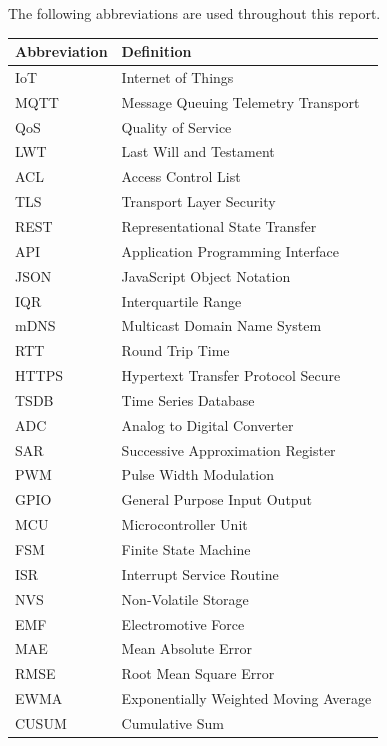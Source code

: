\documentclass[a4paper, oneside, 13.5pt, top=2.5cm, bottom=2.5cm, left=3cm, right=2.5cm]{book}
\begin{document}
\tableofcontents
\newpage
\listoftables
\listoffigures
\newpage
\pagestyle{fancy}

\begin{abbreviation}
The following abbreviations are used throughout this report.
\begin{table}[!h]
\renewcommand{\arraystretch}{1.3}
\begin{tabular}{p{3cm} p{11cm}}
\textbf{Abbreviation} &  \textbf{Definition} \\
\hline
IoT   & Internet of Things \\
MQTT  & Message Queuing Telemetry Transport \\
QoS   & Quality of Service \\
LWT   & Last Will and Testament \\
ACL   & Access Control List \\
TLS   & Transport Layer Security \\
REST  & Representational State Transfer \\
API   & Application Programming Interface \\
JSON  & JavaScript Object Notation \\
IQR   & Interquartile Range \\
mDNS  & Multicast Domain Name System \\
RTT   & Round Trip Time \\
HTTPS & Hypertext Transfer Protocol Secure \\
TSDB  & Time Series Database \\
ADC   & Analog to Digital Converter \\
SAR   & Successive Approximation Register \\
PWM   & Pulse Width Modulation \\
GPIO  & General Purpose Input Output \\
MCU   & Microcontroller Unit \\
FSM   & Finite State Machine \\
ISR   & Interrupt Service Routine \\
NVS   & Non-Volatile Storage \\
EMF   & Electromotive Force \\
MAE   & Mean Absolute Error \\
RMSE  & Root Mean Square Error \\
EWMA  & Exponentially Weighted Moving Average \\
CUSUM & Cumulative Sum \\
\hline
\end{tabular}
\end{table}
\end{abbreviation}
\newpage
\pagestyle{fancy}







\appendix




\end{document}
